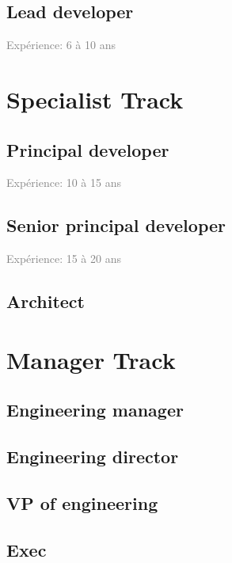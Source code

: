 \documentclass[a4paper, french, openany, 12pt]{book}
\newcommand\xp[1]{\textcolor{Gray}{Expérience: {#1} ans}}
\begin{document}
\chapter{Lead developer}

\xp{6 à 10}

\part{Specialist Track}

\chapter{Principal developer}

\xp{10 à 15}

\chapter{Senior principal developer}

\xp{15 à 20}

\chapter{Architect}

\part{Manager Track}

\chapter{Engineering manager}

\chapter{Engineering director}

\chapter{VP of engineering}

\chapter{Exec}

\backmatter

\tableofcontents
\end{document}
